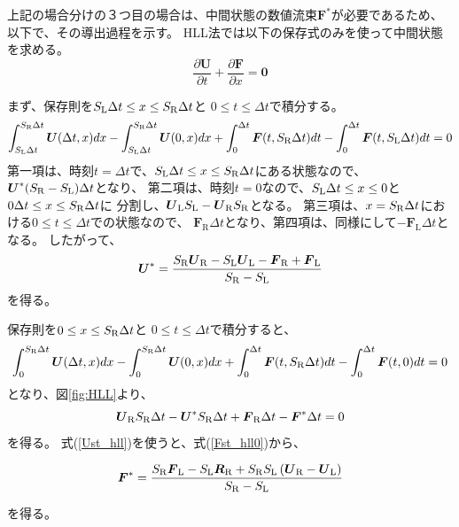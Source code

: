 上記の場合分けの３つ目の場合は、中間状態の数値流束$\bm{ F}^*$が必要であるため、
以下で、その導出過程を示す。
HLL法では以下の保存式のみを使って中間状態を求める。
\begin{equation}
    \frac{\partial \bm{ U}}{\partial t}
    + \frac{\partial \bm{ F}}{\partial x} = \bm{ 0}
\end{equation}

まず、保存則を$S_\mathrm{L}\Delta t\le x \le S_\mathrm{R}\Delta t$と $0\le t\le \Delta t$で積分する。
\begin{equation}
    \int_{S_\mathrm{L}\Delta t}^{S_\mathrm{R} \Delta t} {\mbox{\boldmath $ U$}}(\Delta t, x) dx 
    - \int_{S_\mathrm{L}\Delta t}^{S_\mathrm{R} \Delta t}{\mbox{\boldmath $ U$}}(0, x)dx
    + \int_{0}^{\Delta t} {\mbox{\boldmath $ F$}}(t,S_\mathrm{R}\Delta t) dt
    - \int_{0}^{\Delta t} {\mbox{\boldmath $ F$}}(t, S_\mathrm{L} \Delta t) dt  = 0
\end{equation}
第一項は、時刻$t=\Delta t$で、$S_\mathrm{L}\Delta t\le x \le S_\mathrm{R}\Delta t$にある状態なので、
${\mbox{\boldmath $ U$}}^* (S_\mathrm{R} - S_\mathrm{L})\Delta t$となり、
第二項は、時刻$t=0$なので、$S_\mathrm{L}\Delta t\le x\le 0$と$0\Delta t\le x\le S_\mathrm{R} \Delta t$に
分割し、${\mbox{\boldmath $ U$}}_\mathrm{L}S_\mathrm{L} - {\mbox{\boldmath $ U$}}_\mathrm{R} S_\mathrm{R}$となる。
第三項は、$x=S_\mathrm{R} \Delta t$における$0\le t\le \Delta t$での状態なので、
$\bm{ F}_\mathrm{R}\Delta t$となり、第四項は、同様にして$-\bm{ F}_\mathrm{L}\Delta t$となる。
したがって、
\begin{equation}
{\mbox{\boldmath $ U$}}^* = \frac{
S_\mathrm{R} {\mbox{\boldmath $ U$}}_\mathrm{R}
- S_\mathrm{L} {\mbox{\boldmath $ U$}}_\mathrm{L}
- {\mbox{\boldmath $ F$}}_\mathrm{R} + {\mbox{\boldmath $ F$}}_\mathrm{L}
}{S_\mathrm{R} - S_\mathrm{L}}
\label{Ust_hll}
\end{equation}
を得る。

保存則を$0\le x\le S_\mathrm{R}\Delta t$と $0\le t\le \Delta t$で積分すると、
\begin{equation}
    \int_0^{S_\mathrm{R}\Delta t} {\mbox{\boldmath $ U$}}(\Delta t, x) dx 
    - \int_0^{S_\mathrm{R}\Delta t}{\mbox{\boldmath $ U$}}(0, x)dx
    + \int_{0}^{\Delta t} {\mbox{\boldmath $ F$}}(t,S_\mathrm{R}\Delta t) dt
    - \int_{0}^{\Delta t} {\mbox{\boldmath $ F$}}(t,0) dt  = 0
    \label{Fst_hll0}
\end{equation}
となり、図\ref{fig:HLL}より、
\begin{equation}
{\mbox{\boldmath $ U$}}_\mathrm{R} S_\mathrm{R} \Delta t - {\mbox{\boldmath $ U$}}^* S_\mathrm{R} \Delta t  
+ {\mbox{\boldmath $ F$}}_\mathrm{R}\Delta t - {\mbox{\boldmath $ F$}}^* \Delta t= 0
\end{equation}
を得る。
式(\ref{Ust_hll})を使うと、式(\ref{Fst_hll0})から、
\begin{screen}
\begin{equation}
{\mbox{\boldmath $ F$}}^* = \frac{
S_\mathrm{R} {\mbox{\boldmath $ F$}}_\mathrm{L}
- S_\mathrm{L} {\mbox{\boldmath $ R$}}_\mathrm{R}
+ S_\mathrm{R} S_\mathrm{L} \left({\mbox{\boldmath $ U$}}_\mathrm{R} - {\mbox{\boldmath $ U$}}_\mathrm{L}\right)
}{S_\mathrm{R} - S_\mathrm{L}}
    \label{Fst_hll}
\end{equation}
\end{screen}
を得る。

